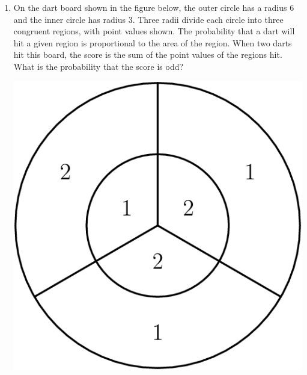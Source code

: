 \documentclass{article}
\begin{document}
\begin{enumerate}
\begin{center}
        \end{center}
        \vspace{3cm}
    \item On the dart board shown in the figure below, the outer circle has a radius $6$ and the inner circle has radius $3$.
        Three radii divide each circle into three congruent regions, with point values shown.
        The probability that a dart will hit a given region is proportional to the area of the region.
        When two darts hit this board, the score is the sum of the point values of the regions hit.
        What is the probability that the score is odd?
        \begin{center}
            \includegraphics[scale=0.25]{dart-board.png}
        \end{center}
        \vspace{3cm}
\end{enumerate}
\end{document}
